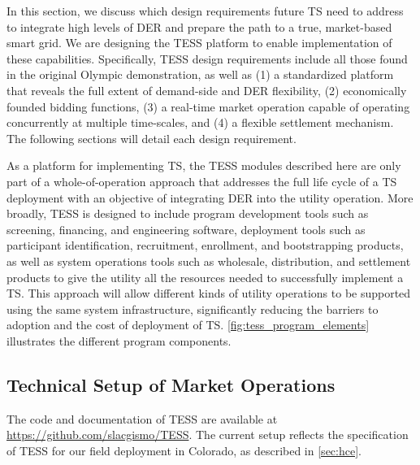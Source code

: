 \documentclass[12pt]{article}{Definitions/mdpi}
\begin{document}
In this section, we discuss which design requirements future TS need to address to integrate high levels of DER and prepare the path to a true, market-based smart grid.
We are designing the TESS platform to enable implementation of these capabilities.
Specifically, TESS design requirements include all those found in the original Olympic demonstration, as well as (1) a standardized platform that reveals the full extent of demand-side and DER flexibility, (2) economically founded bidding functions, (3) a real-time market operation capable of operating concurrently at multiple time-scales, and (4) a flexible settlement mechanism. The following sections will detail each design requirement.



As a platform for implementing TS, the TESS modules described here are only part of a whole-of-operation approach that addresses the full life cycle of a TS deployment with an objective of integrating DER into the utility operation.  
More broadly, TESS is designed to include program development tools such as screening, financing, and engineering software, deployment tools such as participant identification, recruitment, enrollment, and bootstrapping products, as well as system operations tools such as wholesale, distribution, and settlement products to give the utility all the resources needed to successfully implement a TS.
This approach will allow different kinds of utility operations to be supported using the same system infrastructure, significantly reducing the barriers to adoption and the cost of deployment of TS. 
\cref{fig:tess_program_elements} illustrates the different program components.

\subsection{Technical Setup of Market Operations}\label{sec:technical_setup}

The code and documentation of TESS are available at \url{https://github.com/slacgismo/TESS}. The current setup reflects the specification of TESS for our field deployment in Colorado, as described in \cref{sec:hce}.
\end{document}
